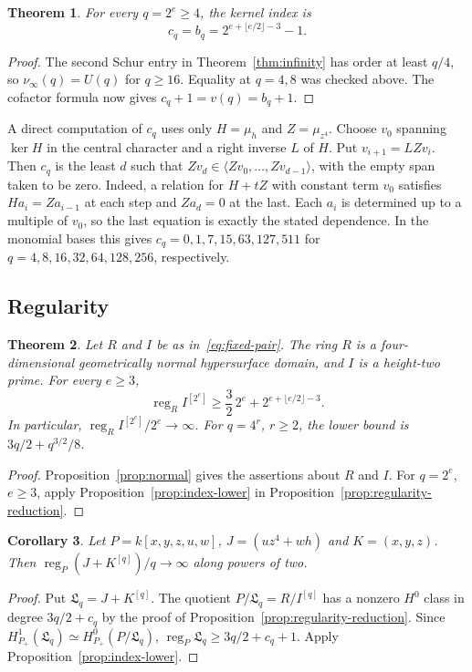 \documentclass[11pt,a4paper,reqno]{amsart}
\numberwithin{equation}{section}
\theoremstyle{plain}
\newtheorem{theorem}{Theorem}[section]
\newtheorem{corollary}[theorem]{Corollary}
\theoremstyle{definition}
\theoremstyle{remark}
\DeclareMathOperator{\reg}{reg}
\begin{document}
\begin{theorem}\label{thm:index}
For every $q=2^e\geq4$, the kernel index is
\[
 c_q=b_q=2^{e+\lfloor e/2\rfloor-3}-1.
\]
\end{theorem}
\begin{proof}
The second Schur entry in Theorem~\ref{thm:infinity} has order
at least $q/4$, so $\nu_\infty(q)=U(q)$ for $q\geq16$. Equality at
$q=4,8$ was checked above. The cofactor formula now gives
$c_q+1=v(q)=b_q+1$.
\end{proof}

A direct computation of $c_q$ uses only $H=\mu_h$ and $Z=\mu_{z^4}$.
Choose $v_0$ spanning $\ker H$ in the central character and a right
inverse $L$ of $H$. Put $v_{i+1}=LZv_i$. Then $c_q$ is the least $d$
such that $Zv_d\in\langle Zv_0,\ldots,Zv_{d-1}\rangle$, with the
empty span taken to be zero. Indeed, a relation for $H+tZ$ with
constant term $v_0$ satisfies $Ha_i=Za_{i-1}$ at each step and
$Za_d=0$ at the last. Each $a_i$ is determined up to a multiple
of $v_0$, so the last equation is exactly the stated dependence.
In the monomial bases this gives $c_q=0,1,7,15,63,127,511$ for
$q=4,8,16,32,64,128,256$, respectively.

\subsection{Regularity}
\begin{theorem}\label{thm:regularity}
Let $R$ and $I$ be as in~\eqref{eq:fixed-pair}. The ring $R$ is a
four-dimensional geometrically normal hypersurface domain, and $I$ is a
height-two prime. For every $e\geq3$,
\[
\reg_R I^{[2^e]}\geq\frac32\,2^e+2^{e+\lfloor e/2\rfloor-3}.
\]
In particular, $\reg_R I^{[2^e]}/2^e\to\infty$.
For $q=4^r$, $r\geq2$, the lower bound is $3q/2+q^{3/2}/8$.
\end{theorem}
\begin{proof}
Proposition~\ref{prop:normal} gives the assertions about $R$ and $I$.
For $q=2^e$, $e\geq3$, apply Proposition~\ref{prop:index-lower} in
Proposition~\ref{prop:regularity-reduction}.
\end{proof}
\begin{corollary}\label{cor:polynomial-regularity}
Let $P=k[x,y,z,u,w]$, $J=(uz^4+wh)$ and $K=(x,y,z)$.
Then $\reg_P(J+K^{[q]})/q\to\infty$ along powers of two.
\end{corollary}
\begin{proof}
Put $\mathfrak L_q=J+K^{[q]}$. The quotient $P/\mathfrak L_q=R/I^{[q]}$ has a nonzero
$H^0$ class in degree $3q/2+c_q$ by the proof of
Proposition~\ref{prop:regularity-reduction}. Since
$H^1_{P_+}(\mathfrak L_q)\simeq H^0_{P_+}(P/\mathfrak L_q)$,
$\reg_P \mathfrak L_q\geq3q/2+c_q+1$. Apply Proposition~\ref{prop:index-lower}.
\end{proof}
\end{document}
